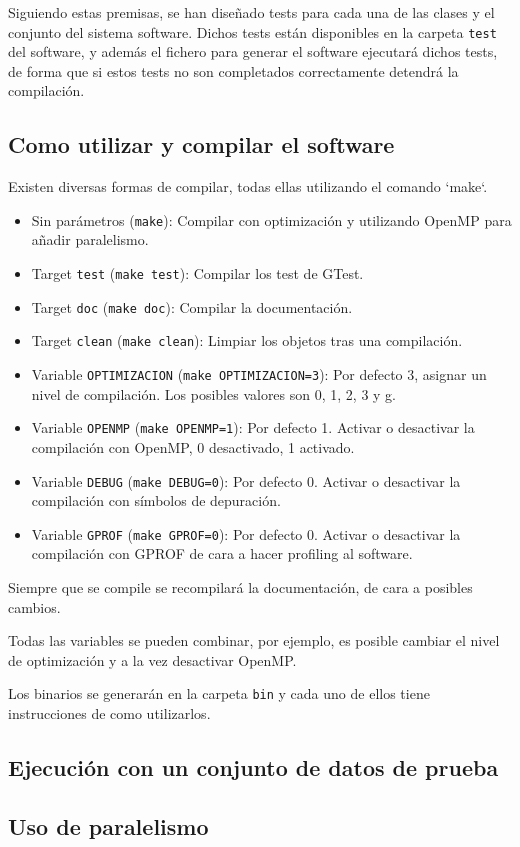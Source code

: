 Siguiendo estas premisas, se han diseñado tests para cada una de las clases y el conjunto del sistema software. Dichos tests están disponibles en la carpeta \texttt{test} del software, y además el fichero para generar el software ejecutará dichos tests, de forma que si estos tests no son completados correctamente detendrá la compilación.

\newpage

\subsection{Como utilizar y compilar el software}

Existen diversas formas de compilar, todas ellas utilizando el comando `make`.

\begin{itemize}
	\item Sin parámetros (\texttt{make}): Compilar con optimización y utilizando OpenMP para añadir paralelismo.
	\item Target \texttt{test} (\texttt{make test}): Compilar los test de GTest.
	\item Target \texttt{doc} (\texttt{make doc}): Compilar la documentación.
	\item Target \texttt{clean} (\texttt{make clean}): Limpiar los objetos tras una compilación.
	\item Variable \texttt{OPTIMIZACION} (\texttt{make OPTIMIZACION=3}): Por defecto 3, asignar un nivel de compilación. Los posibles valores son 0, 1, 2, 3 y g.
	\item Variable \texttt{OPENMP} (\texttt{make OPENMP=1}): Por defecto 1. Activar o desactivar la compilación con OpenMP, 0 desactivado, 1 activado.
	\item Variable \texttt{DEBUG} (\texttt{make DEBUG=0}): Por defecto 0. Activar o desactivar la compilación con símbolos de depuración.
	\item Variable \texttt{GPROF} (\texttt{make GPROF=0}): Por defecto 0. Activar o desactivar la compilación con GPROF de cara a hacer profiling al software.

\end{itemize}

Siempre que se compile se recompilará la documentación, de cara a posibles cambios.

Todas las variables se pueden combinar, por ejemplo, es posible cambiar el nivel de optimización y a la vez desactivar OpenMP.

Los binarios se generarán en la carpeta \texttt{bin} y cada uno de ellos tiene instrucciones de como utilizarlos.

\subsection{Ejecución con un conjunto de datos de prueba}

\subsection{Uso de paralelismo}
